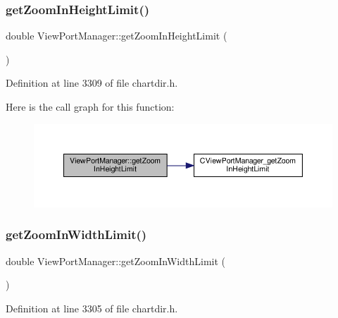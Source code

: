 \subsubsection{\texorpdfstring{get\+Zoom\+In\+Height\+Limit()}{getZoomInHeightLimit()}}
{\footnotesize\ttfamily double View\+Port\+Manager\+::get\+Zoom\+In\+Height\+Limit (\begin{DoxyParamCaption}{ }\end{DoxyParamCaption})\hspace{0.3cm}{\ttfamily [inline]}}



Definition at line 3309 of file chartdir.\+h.

Here is the call graph for this function\+:
\nopagebreak
\begin{figure}[H]
\begin{center}
\leavevmode
\includegraphics[width=350pt]{class_view_port_manager_a97ddd1d6300e677ae55fd3095c815f3f_cgraph}
\end{center}
\end{figure}
\mbox{\label{class_view_port_manager_abb094171925d74b09ca34b4b5516d99a}} 
\subsubsection{\texorpdfstring{get\+Zoom\+In\+Width\+Limit()}{getZoomInWidthLimit()}}
{\footnotesize\ttfamily double View\+Port\+Manager\+::get\+Zoom\+In\+Width\+Limit (\begin{DoxyParamCaption}{ }\end{DoxyParamCaption})\hspace{0.3cm}{\ttfamily [inline]}}



Definition at line 3305 of file chartdir.\+h.

